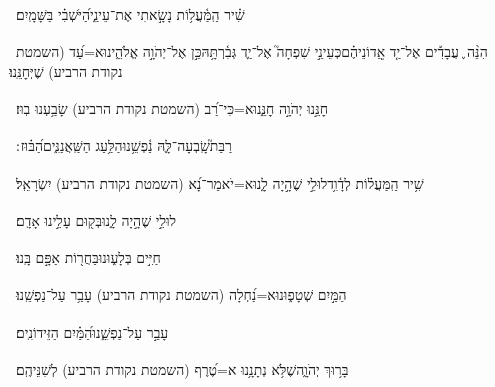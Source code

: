 \documentclass[12pt]{article}
\newcommand{\loc}[1]{\textsuperscript{\locf{#1}}}
\begin{document}
\pstart[\subsection*{\textcolor{red}{פרק קכג}}]\label{פרק קכג}
{\loc{ א}~}‏שִׁ֗יר הַֽמַּ֫עֲל֥וֹת\newline\hspace*{.5em} נָשָׂ֣אתִי אֶת־עֵינַ֑י{\hfill}הַ֝יֹּשְׁבִ֗י בַּשָּׁמָֽיִם׃\par

{\loc{ ב}~}‏הִנֵּ֨ה ֪ עֲבָדִ֡ים אֶל־יַ֤ד אֲֽדוֹנֵיהֶ֗ם{\hfill}כְּעֵינֵ֣י שִׁפְחָה֮ אֶל־יַ֢ד גְּבִ֫רְתָּ֥הּ\newline\hspace*{.5em}כֵּ֣ן  אֶל־יְהֹוָ֣ה אֱלֹהֵ֑ינוּ{\hfill}א=עַ֝ד (השמטת נקודת הרביע) שֶׁיְּחׇנֵּֽנוּ׃\par

{\loc{ ג}~}‏חׇנֵּ֣נוּ יְהֹוָ֣ה חׇנֵּ֑נוּ{\hfill}א=כִּי־רַ֝ב (השמטת נקודת הרביע) שָׂבַ֥עְנוּ בֽוּז׃\par

{\loc{ ד}~}‏רַבַּת֮{\hfill}שָֽׂבְעָה־לָּ֢הּ נַ֫פְשֵׁ֥נוּ\newline\hspace*{.5em}הַלַּ֥עַג הַשַּֽׁאֲנַנִּ֑ים{\hfill}הַ֝בּ֗וּז ׃\par\pend
\ledpb
\pstart[\subsection*{\textcolor{red}{פרק קכד}}]\label{פרק קכד}
{\loc{ א}~}‏שִׁ֥יר הַֽמַּעֲל֗וֹת לְדָ֫וִ֥ד\newline\hspace*{.5em}לוּלֵ֣י  שֶׁהָ֣יָה לָ֑נוּ{\hfill}א=יֹאמַר־נָ֝א (השמטת נקודת הרביע) יִשְׂרָאֵֽל׃\par

{\loc{ ב}~}‏לוּלֵ֣י  שֶׁהָ֣יָה לָ֑נוּ{\hfill}בְּק֖וּם עָלֵ֣ינוּ אָדָֽם׃\par

{\loc{ ג}~}‏ חַיִּ֣ים בְּלָע֑וּנוּ{\hfill}בַּחֲר֖וֹת אַפָּ֣ם בָּֽנוּ׃\par

{\loc{ ד}~}‏ הַמַּ֣יִם שְׁטָפ֑וּנוּ{\hfill}א=נַ֝חְלָה (השמטת נקודת הרביע) עָבַ֥ר עַל־נַפְשֵֽׁנוּ׃\par

{\loc{ ה}~}‏ עָבַ֣ר עַל־נַפְשֵׁ֑נוּ{\hfill}הַ֝מַּ֗יִם הַזֵּידוֹנִֽים׃\par

{\loc{ ו}~}‏בָּר֥וּךְ יְהֹוָ֑ה{\hfill}שֶׁלֹּ֥א נְתָנָ֥נוּ א=טֶ֝רֶף (השמטת נקודת הרביע) לְשִׁנֵּיהֶֽם׃\par
\end{document}
